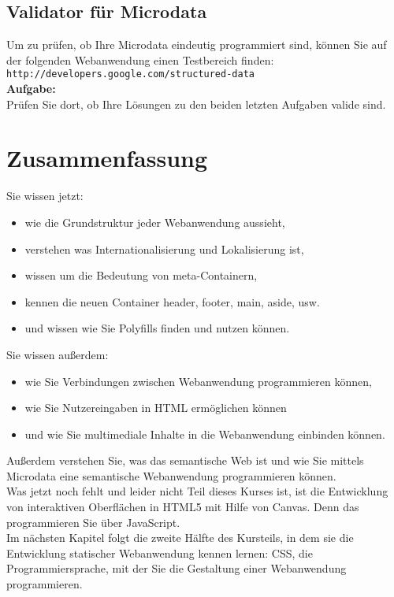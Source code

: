 \subsection{Validator für Microdata}

Um zu prüfen, ob Ihre Microdata eindeutig programmiert sind, können Sie auf der folgenden Webanwendung einen Testbereich finden:\\

\verb|http://developers.google.com/structured-data|  \\

\textbf{Aufgabe:}\\

Prüfen Sie dort, ob Ihre Lösungen zu den beiden letzten Aufgaben valide sind.

\section{Zusammenfassung}

Sie wissen jetzt:

\begin{itemize}
	\item wie die Grundstruktur jeder Webanwendung aussieht,
	\item verstehen was Internationalisierung und Lokalisierung ist,
	\item wissen um die Bedeutung von meta-Containern,
	\item kennen die neuen Container header, footer, main, aside, usw.
	\item und wissen wie Sie Polyfills finden und nutzen können.
\end{itemize}

Sie wissen außerdem:

\begin{itemize}
	\item wie Sie Verbindungen zwischen Webanwendung programmieren können,
	\item wie Sie Nutzereingaben in HTML ermöglichen können
	\item und wie Sie multimediale Inhalte in die Webanwendung einbinden können.
\end{itemize}

Außerdem verstehen Sie, was das semantische Web ist und wie Sie mittels Microdata eine semantische Webanwendung programmieren können.\\

Was jetzt noch fehlt und leider nicht Teil dieses Kurses ist, ist die Entwicklung von interaktiven Oberflächen in HTML5 mit Hilfe von Canvas. Denn das programmieren Sie über JavaScript.\\

Im nächsten Kapitel folgt die zweite Hälfte des Kursteils, in dem sie die Entwicklung statischer Webanwendung kennen lernen: CSS, die Programmiersprache, mit der Sie die Gestaltung einer Webanwendung programmieren.